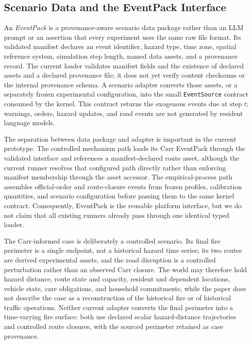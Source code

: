 \documentclass[journal]{IEEEtran}
\begin{document}
\subsection{Scenario Data and the EventPack Interface}

An \emph{EventPack} is a provenance-aware scenario data package rather than an
LLM prompt or an assertion that every experiment uses the same raw file format.
Its validated manifest declares an event identifier, hazard type, time zone,
spatial reference system, simulation step length, named data assets, and a
provenance record. The current loader validates manifest fields and the
existence of declared assets and a declared provenance file; it does not yet
verify content checksums or the internal provenance schema. A scenario adapter
converts those assets, or a separately frozen experimental configuration, into
the small
\texttt{EventSource} contract consumed by the kernel. This contract returns the
exogenous events due at step $t$; warnings, orders, hazard updates, and road
events are not generated by resident language models.

The separation between data package and adapter is important in the current
prototype. The controlled mechanism path loads its Carr EventPack through the
validated interface and references a manifest-declared route asset, although the
current runner resolves that configured path directly rather than enforcing
manifest membership through the asset accessor. The empirical-process path
assembles official-order and route-closure events from frozen profiles,
calibration quantities, and scenario
configuration before passing them to the same kernel contract. Consequently,
EventPack is the reusable platform interface, but we do not claim that all
existing runners already pass through one identical typed loader.

The Carr-informed case is deliberately a controlled scenario. Its final fire
perimeter is a single endpoint, not a historical hazard time series; its two
routes are derived experimental assets, and the road disruption is a controlled
perturbation rather than an observed Carr closure. The world may therefore hold
hazard distance, route state and capacity, resident and dependent locations,
vehicle state, care obligations, and household commitments, while the paper
does not describe the case as a reconstruction of the historical fire or of
historical traffic operations. Neither current adapter converts the final
perimeter into a time-varying fire surface: both use declared scalar
hazard-distance trajectories and controlled route closures, with the sourced
perimeter retained as case provenance.
\end{document}
